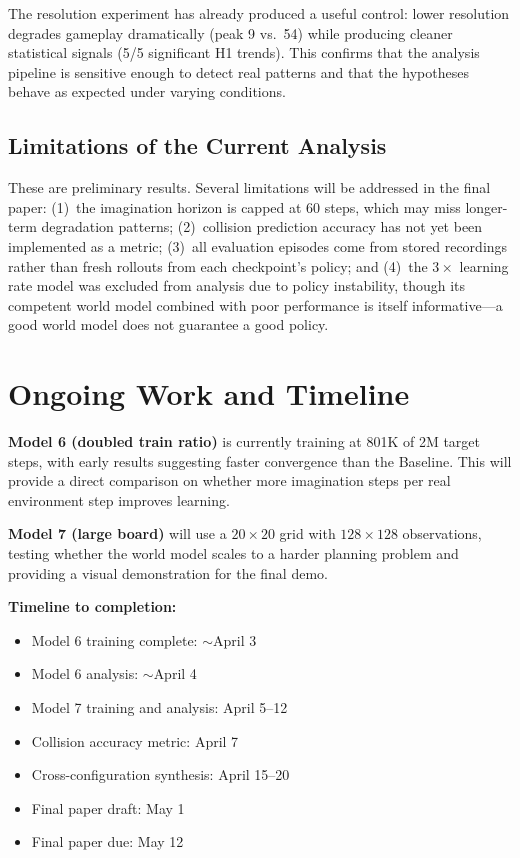 \documentclass[letterpaper]{article}
\begin{document}
The resolution experiment has already produced a useful control: lower resolution degrades gameplay dramatically (peak 9 vs.\ 54) while producing cleaner statistical signals (5/5 significant H1 trends). This confirms that the analysis pipeline is sensitive enough to detect real patterns and that the hypotheses behave as expected under varying conditions.

\subsection{Limitations of the Current Analysis}

These are preliminary results. Several limitations will be addressed in the final paper: (1)~the imagination horizon is capped at 60 steps, which may miss longer-term degradation patterns; (2)~collision prediction accuracy has not yet been implemented as a metric; (3)~all evaluation episodes come from stored recordings rather than fresh rollouts from each checkpoint's policy; and (4)~the $3\times$ learning rate model was excluded from analysis due to policy instability, though its competent world model combined with poor performance is itself informative---a good world model does not guarantee a good policy.


\section{Ongoing Work and Timeline}
\label{sec:ongoing}

\textbf{Model 6 (doubled train ratio)} is currently training at 801K of 2M target steps, with early results suggesting faster convergence than the Baseline. This will provide a direct comparison on whether more imagination steps per real environment step improves learning.

\textbf{Model 7 (large board)} will use a $20 \times 20$ grid with $128 \times 128$ observations, testing whether the world model scales to a harder planning problem and providing a visual demonstration for the final demo.

\textbf{Timeline to completion:}
\begin{itemize}
    \item Model 6 training complete: $\sim$April 3
    \item Model 6 analysis: $\sim$April 4
    \item Model 7 training and analysis: April 5--12
    \item Collision accuracy metric: April 7
    \item Cross-configuration synthesis: April 15--20
    \item Final paper draft: May 1
    \item Final paper due: May 12
\end{itemize}
\end{document}
